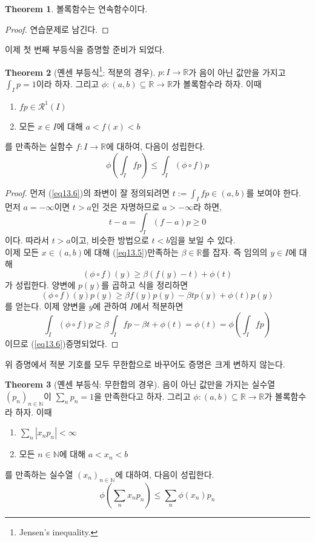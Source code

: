 \documentclass[11pt]{book}
\numberwithin{equation}{chapter}
\def\NN{\mathbb{N}}
\def\RR{\mathbb{R}}
\def\calR{\mathcal{R}}
\newcommand{\abs}[1]{\left\vert#1\right\vert}
\newcommand{\paren}[1]{\left(#1\right)}
\theoremstyle{definition}
\newtheorem{thm}{Theorem}[section]
\newenvironment{enum}
	{\begin{enumerate}[label=(\alph*), leftmargin=2\parindent]}
	{\end{enumerate}}
\begin{document}
\begin{thm}
    볼록함수는 연속함수이다.
\end{thm}
\begin{proof}
    연습문제로 남긴다.
\end{proof}

이제 첫 번째 부등식을 증명할 준비가 되었다.

\begin{thm}[옌센 부등식\footnote{Jensen's inequality.}: 적분의 경우]
    \(p : I \to \RR\)가 음이 아닌 값만을 가지고 \(\int_{I} p = 1\)이라 하자. 그리고 \(\phi : (a, b) \subseteq \RR \to \RR\)가 볼록함수라 하자. 이때
    \begin{enum}
        \item \(fp \in \calR^1(I)\)
        \item 모든 \(x \in I\)에 대해 \(a < f(x) < b\)
    \end{enum}
    를 만족하는 실함수 \(f : I \to \RR\)에 대하여, 다음이 성립한다.
    \begin{equation} \label{eq13.6}
        \phi \paren{\int_I fp} \le \int_I (\phi \circ f)p
    \end{equation}
\end{thm}
\begin{proof}
    먼저 (\ref{eq13.6})의 좌변이 잘 정의되려면 \(t := \int_I fp \in (a, b)\)를 보여야 한다. 먼저 \(a = -\infty\)이면 \(t > a\)인 것은 자명하므로 \(a > -\infty\)라 하면,
    \[
        t - a = \int_I (f - a)p \ge 0
    \]
    이다. 따라서 \(t > a\)이고, 비슷한 방법으로 \(t < b\)임을 보일 수 있다.\\
    이제 모든 \(x \in (a, b)\)에 대해 (\ref{eq13.5})\를 만족하는 \(\beta \in \RR\)를 잡자. 즉 임의의 \(y \in I\)에 대해
    \[
    (\phi \circ f)(y) \ge \beta(f(y)-t) + \phi(t)    
    \]
    가 성립한다. 양변에 \(p(y)\)를 곱하고 식을 정리하면
    \[
        (\phi \circ f)(y)p(y) \ge \beta f(y)p(y) - \beta t p(y) + \phi(t)p(y)
    \] 
    를 얻는다. 이제 양변을 \(y\)에 관하여 \(I\)에서 적분하면
    \[
        \int_I (\phi \circ f)p \ge \beta \int_I fp - \beta t + \phi(t) = \phi(t) = \phi \paren{\int_I fp}
    \]
    이므로 (\ref{eq13.6})\이 증명되었다.
\end{proof}

위 증명에서 적분 기호를 모두 무한합으로 바꾸어도 증명은 크게 변하지 않는다.

\begin{thm}[옌센 부등식: 무한합의 경우]
    음이 아닌 값만을 가지는 실수열 \((p_n)_{n \in \NN}\)이 \(\sum_n p_n = 1\)을 만족한다고 하자. 그리고 \(\phi : (a, b) \subseteq \RR \to \RR\)가 볼록함수라 하자. 이때
    \begin{enum}
        \item \(\sum_n \abs{x_n p_n} < \infty\)
        \item 모든 \(n \in \NN\)에 대해 \(a < x_n < b\)
    \end{enum}
    를 만족하는 실수열 \((x_n)_{n \in \NN}\)에 대하여, 다음이 성립한다.
    \[
        \phi \paren{\sum_n x_n p_n} \le \sum_n \phi(x_n)p_n  
    \]
\end{thm}
\end{document}

